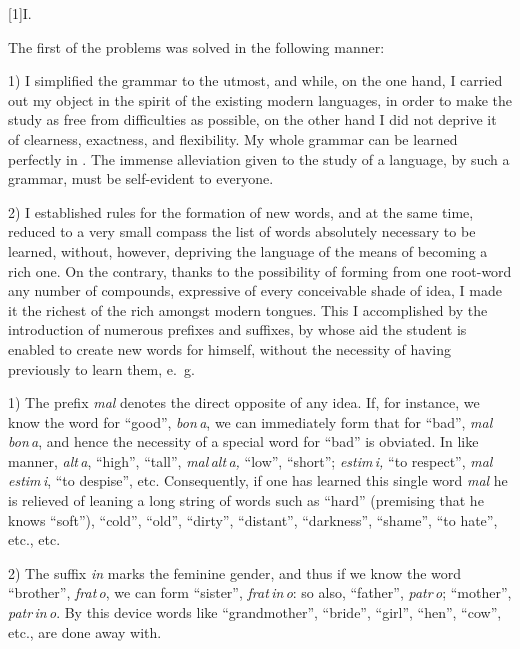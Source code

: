 \documentclass[12pt,twoside]{book}
\begin{document}
\vspace{12pt}

{\hfil \scalebox{2}[1]{\large\cowboyfont I.}}

\vspace{12pt}

The first of the problems was solved in the following manner:

1) I simplified the grammar to the utmost, and while, on the one hand, I carried out my object in the spirit of the existing modern languages, in order to make the study as free from difficulties as possible, on the other hand I did not deprive it of clearness, exactness, and flexibility. My whole grammar can be learned perfectly in . The immense alleviation given to the study of a language, by such a grammar, must be self-evident to everyone.

2) I established rules for the formation of new words, and at the same time, reduced to a very small compass the list of words absolutely necessary to be learned, without, however, depriving the language of the means of becoming a rich one. On the contrary, thanks to the possibility of forming from one root-word any number of compounds, expressive of every conceivable shade of idea, I made it the richest of the rich amongst modern tongues. This I accomplished by the introduction of numerous prefixes and suffixes, by whose aid the student is enabled to create new words for himself, without the necessity of having previously to learn them, e.~g.

1) The prefix \emph{mal} denotes the direct opposite of any idea. If, for instance, we know the word for “good”, \emph{bon\,a}, we can immediately form that for “bad”, \emph{mal\,bon\,a}, and hence the necessity of a special word for “bad” is obviated. In like manner, \emph{alt\,a}, “high”, “tall”, \emph{mal\,alt\,a,} “low”, “short”; \emph{estim\,i,} “to respect”, \emph{mal\,estim\,i}, “to despise”, etc. Consequently, if one has learned this single word \emph{mal} he is relieved of leaning a long string of words such as “hard” (premising that he knows “soft”), “cold”, “old”, “dirty”, “distant”, “darkness”, “shame”, “to hate”, etc., etc.

2) The suffix \emph{in} marks the feminine gender, and thus if we know the word “brother”, \emph{frat\,o}, we can form “sister”, \emph{frat\,in\,o}: so also, “father”, \emph{patr\,o}; “mother”, \emph{patr\,in\,o}. By this device words like “grandmother”, “bride”, “girl”, “hen”, “cow”, etc., are done away with.
\end{document}
